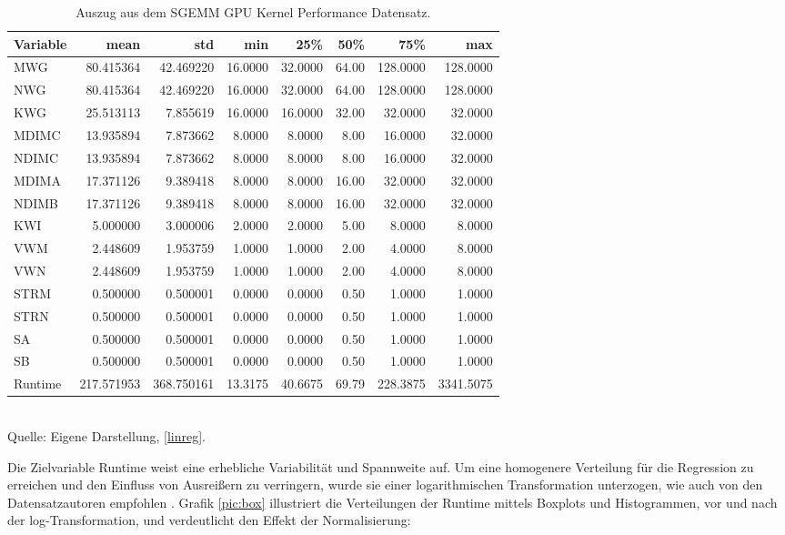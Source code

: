 \begin{table}[!h]
    \caption{Auszug aus dem SGEMM GPU Kernel Performance Datensatz.}
    \footnotesize
    \begin{tabularx}{\textwidth}{Xrrrrrrr}
    \toprule
    Variable & mean & std & min & 25\% & 50\% & 75\% & max \\
    \midrule
    MWG & 80.415364 & 42.469220 & 16.0000 & 32.0000 & 64.00 & 128.0000 & 128.0000 \\
    NWG & 80.415364 & 42.469220 & 16.0000 & 32.0000 & 64.00 & 128.0000 & 128.0000 \\
    KWG & 25.513113 & 7.855619 & 16.0000 & 16.0000 & 32.00 & 32.0000 & 32.0000 \\
    MDIMC & 13.935894 & 7.873662 & 8.0000 & 8.0000 & 8.00 & 16.0000 & 32.0000 \\
    NDIMC & 13.935894 & 7.873662 & 8.0000 & 8.0000 & 8.00 & 16.0000 & 32.0000 \\
    MDIMA & 17.371126 & 9.389418 & 8.0000 & 8.0000 & 16.00 & 32.0000 & 32.0000 \\
    NDIMB & 17.371126 & 9.389418 & 8.0000 & 8.0000 & 16.00 & 32.0000 & 32.0000 \\
    KWI & 5.000000 & 3.000006 & 2.0000 & 2.0000 & 5.00 & 8.0000 & 8.0000 \\
    VWM & 2.448609 & 1.953759 & 1.0000 & 1.0000 & 2.00 & 4.0000 & 8.0000 \\
    VWN & 2.448609 & 1.953759 & 1.0000 & 1.0000 & 2.00 & 4.0000 & 8.0000 \\
    STRM & 0.500000 & 0.500001 & 0.0000 & 0.0000 & 0.50 & 1.0000 & 1.0000 \\
    STRN & 0.500000 & 0.500001 & 0.0000 & 0.0000 & 0.50 & 1.0000 & 1.0000 \\
    SA & 0.500000 & 0.500001 & 0.0000 & 0.0000 & 0.50 & 1.0000 & 1.0000 \\
    SB & 0.500000 & 0.500001 & 0.0000 & 0.0000 & 0.50 & 1.0000 & 1.0000 \\
    Runtime & 217.571953 & 368.750161 & 13.3175 & 40.6675 & 69.79 & 228.3875 & 3341.5075 \\
    \bottomrule
    \end{tabularx}
    \label{tab:statistics}
    \normalsize
    \\ Quelle: Eigene Darstellung, \ref{linreg}.
\end{table}

Die Zielvariable Runtime weist eine erhebliche Variabilität und Spannweite auf. 
Um eine homogenere Verteilung für die Regression zu erreichen und den Einfluss 
von Ausreißern zu verringern, wurde sie einer logarithmischen Transformation unterzogen, 
wie auch von den Datensatzautoren empfohlen \cite{misc_sgemm_gpu_kernel_performance_440}. 
Grafik \ref{pic:box} illustriert die Verteilungen der Runtime mittels Boxplots und Histogrammen, 
vor und nach der log-Transformation, und verdeutlicht den Effekt der Normalisierung:

